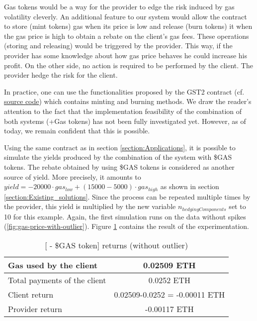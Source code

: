     Gas tokens would be a way for the provider to edge the risk induced by gas volatility cleverly.  An additional feature to our system would allow the contract to store (mint tokens) gas when its price is low and release (burn tokens) it when the gas price is high to obtain a rebate on the client's gas fees. These operations (storing and releasing) would be triggered by the provider. This way, if the provider has some knowledge about how gas price behaves he could increase his profit. On the other side, no action is required to be performed by the client. The provider hedge the risk for the client. 
    
    In practice, one can use the functionalities proposed by the GST2 contract (cf. \href{https://github.com/projectchicago/gastoken/blob/da37d16390f3b91ebbb7d8e7744f4bdd16b3d16a/contract/GST2_ETH.sol#L158}{source code}) which contains minting and burning methods. We draw the reader's attention to the fact that the implementation feasibility of the combination of both systems ({\projectName}+Gas tokens) has not been fully investigated yet. However, as of today, we remain confident that this is possible. 
    
    Using the same contract as in section \ref{section:Applications}, it is possible to simulate the yields produced by the combination of the system with \$GAS tokens. The rebate obtained by using \$GAS tokens is considered as another source of yield. More precisely, it amounts to $yield=-20000\cdot gas_{low}+(15000-5000)\cdot gas_{high}$ as shown in section \ref{section:Existing_solutions}. Since the process can be repeated multiple times by the provider, this yield is multiplied by the new variable $n_{hedgingComponents}$ set to 10 for this example. Again, the first simulation runs on the data without spikes (\ref{fig:gas-price-with-outlier}). Figure \ref{tab:variables:application-4} contains the result of the experimentation.
    
    \begin{table}[htbp]
    \caption{[{\projectName} - \$GAS token] returns (without outlier) }
    \begin{center}
    \begin{tabular}{|l|c|}
    \hline
    Gas used by the client & 0.02509 ETH \\
    \hline
    Total payments of the client & 0.0252 ETH \\
    \hline
    Client return &  0.02509-0.0252 = -0.00011 ETH \\
    \hline
    Provider return & -0.00117 ETH \\
    \hline
    \end{tabular}
    \label{tab:variables:application-4}
    \end{center}
    \end{table}
    
